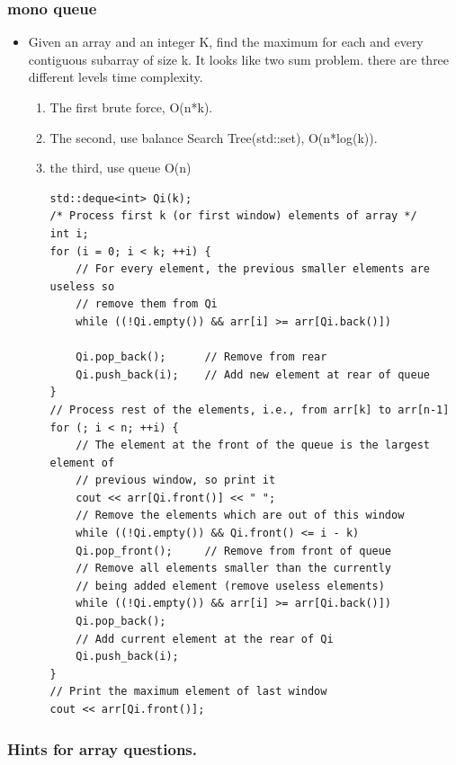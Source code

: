 \documentclass[a4paper,11pt,twoside]{book}
\begin{document}
\subsubsection{mono queue}
\begin{itemize}
	\item Given an array and an integer K, find the maximum for each and every contiguous subarray of size k. It looks like two sum problem. there are three different levels time complexity. 
\begin{enumerate}
	\item The first brute force, O(n*k). 
	\item The second, use balance Search Tree(std::set), O(n*log(k)). 
	\item the third, use queue O(n)
\begin{lstlisting}[breaklines]
std::deque<int> Qi(k);
/* Process first k (or first window) elements of array */
int i;
for (i = 0; i < k; ++i) {
	// For every element, the previous smaller elements are useless so
	// remove them from Qi
	while ((!Qi.empty()) && arr[i] >= arr[Qi.back()])
	
	Qi.pop_back();  	// Remove from rear	
	Qi.push_back(i);    // Add new element at rear of queue
}
// Process rest of the elements, i.e., from arr[k] to arr[n-1]
for (; i < n; ++i) {
	// The element at the front of the queue is the largest element of
	// previous window, so print it
	cout << arr[Qi.front()] << " ";	
	// Remove the elements which are out of this window
	while ((!Qi.empty()) && Qi.front() <= i - k)
	Qi.pop_front();  	// Remove from front of queue	
	// Remove all elements smaller than the currently
	// being added element (remove useless elements)
	while ((!Qi.empty()) && arr[i] >= arr[Qi.back()])
	Qi.pop_back();	
	// Add current element at the rear of Qi
	Qi.push_back(i);
}
// Print the maximum element of last window
cout << arr[Qi.front()];	    
\end{lstlisting}	
	

\end{enumerate}

	
\end{itemize}


\subsubsection{Hints for array questions.}
\end{document}
